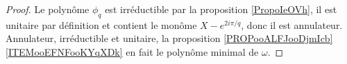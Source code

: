 \begin{proof}
    Le polynôme \( \phi_q\) est irréductible par la proposition \ref{PropoIeOVh}, il est unitaire par définition et contient le monôme \( X- e^{2i\pi/q}\), donc il est annulateur. Annulateur, irréductible et unitaire, la proposition \ref{PROPooALFJooDjmIcb}\ref{ITEMooEFNFooKYqXDk} en fait le polynôme minimal de \( \omega\).
\end{proof}

%
